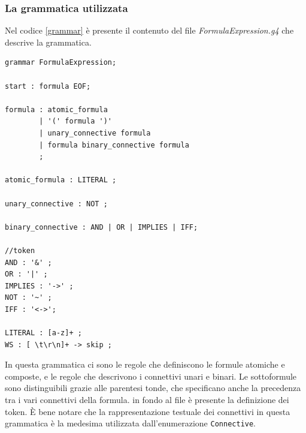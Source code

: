 \documentclass[a4paper,12pt]{report}
\begin{document}
\subsubsection{La grammatica utilizzata}

Nel codice \ref{grammar} è presente il contenuto del file \emph{FormulaExpression.g4} che descrive la grammatica.

\begin{minipage}{\linewidth}
    \small
    \begin{lstlisting}[label=grammar, caption={file FormulaExpression.g4}]
grammar FormulaExpression;

start : formula EOF;

formula : atomic_formula
        | '(' formula ')' 
        | unary_connective formula
        | formula binary_connective formula
        ;

atomic_formula : LITERAL ;

unary_connective : NOT ;

binary_connective : AND | OR | IMPLIES | IFF;

//token
AND : '&' ;
OR : '|' ;
IMPLIES : '->' ;
NOT : '~' ;
IFF : '<->';

LITERAL : [a-z]+ ;
WS : [ \t\r\n]+ -> skip ;
    \end{lstlisting}
\end{minipage}
In questa grammatica ci sono le regole che definiscono le formule atomiche e composte, e le regole che descrivono i connettivi unari e binari. Le sottoformule sono distinguibili grazie alle parentesi tonde, che specificano anche la precedenza tra i vari connettivi della formula. in fondo al file è presente la definizione dei token. È bene notare che la rappresentazione testuale dei connettivi in questa grammatica è la medesima utilizzata dall'enumerazione \texttt{Connective}.
\end{document}
